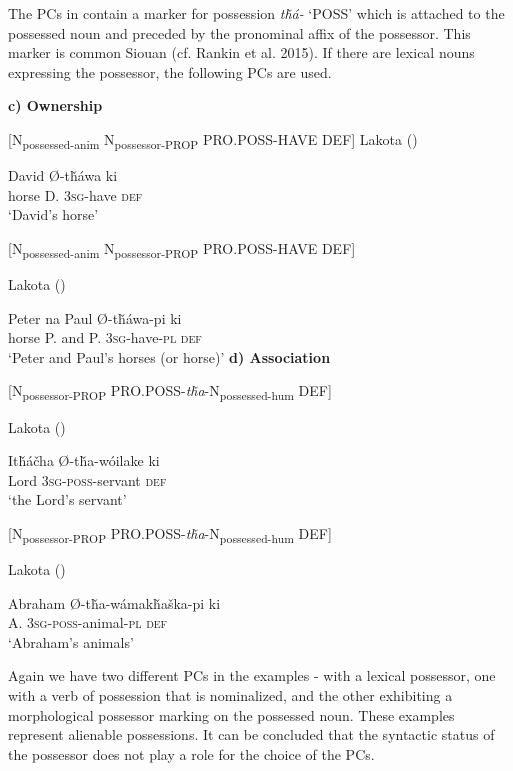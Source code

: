 \documentclass[output=paper]{LSP/langsci}
\begin{document}
The PCs in  contain a marker for possession \textit{t\v{h}á-} `POSS' which is attached to the possessed noun and preceded by the pronominal affix of the possessor. This marker is common Siouan (cf. Rankin et al. 2015). If there are lexical nouns expressing the possessor, the following PCs are used.

\vspace{1em}
\textbf{c)	Ownership}

[N\textsubscript{possessed-anim} N\textsubscript{possessor-PROP} PRO.POSS-HAVE DEF] 
\ea	Lakota (\citealt[91]{Buechel1939}) \label{lakotadavidshorse}

   David   Ø-t\v{h}áwa    ki \\
horse      D.   \textsc{3sg}-have  \textsc{def} \\
\glt `David's horse'
\z

[N\textsubscript{possessed-anim} N\textsubscript{possessor-PROP} PRO.POSS-HAVE DEF]

\ea Lakota (\citealt[91]{Buechel1939})

 Peter  na  Paul   Ø-t\v{h}áwa-pi     ki  \\
horse    P.       and P.      \textsc{3sg}-have-\textsc{pl} \textsc{def} \\
\glt `Peter and Paul's horses (or horse)'
\z
\textbf{d)	Association}

[N\textsubscript{possessor-PROP} PRO.POSS-\textit{t\v{h}a}-N\textsubscript{possessed-hum} DEF]

\ea	Lakota (\citealt[92]{Buechel1939})

\gll It\v{h}\'a\v{c}ha    Ø-t\v{h}a-wóilake   ki  \\
Lord   \textsc{3sg-poss}-servant   \textsc{def} \\
\glt `the Lord's servant'
\z

[N\textsubscript{possessor-PROP} PRO.POSS-\textit{t\v{h}a}-N\textsubscript{possessed-hum} DEF]

\ea	Lakota (\citealt[92]{Buechel1939}) \label{lakotaabraham}

\gll Abraham Ø-t\v{h}a-w\'amak\v{h}a\v{s}ka-pi ki  \\
 A. \textsc{3sg-poss}-animal-\textsc{pl}  \textsc{def} \\
\glt `Abraham's animals'
\z

Again we have two different PCs in the examples - with a lexical possessor, one with a verb of possession that is nominalized, and the other exhibiting a morphological possessor marking on the possessed noun. These examples represent alienable possessions. It can be concluded that the syntactic status of the possessor does not play a role for the choice of the PCs.
\end{document}
